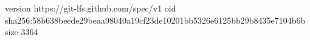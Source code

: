 version https://git-lfs.github.com/spec/v1
oid sha256:58b638beede29beaa98040a19cf23de10201bb5326e6125bb29b8435e7104b6b
size 3364
